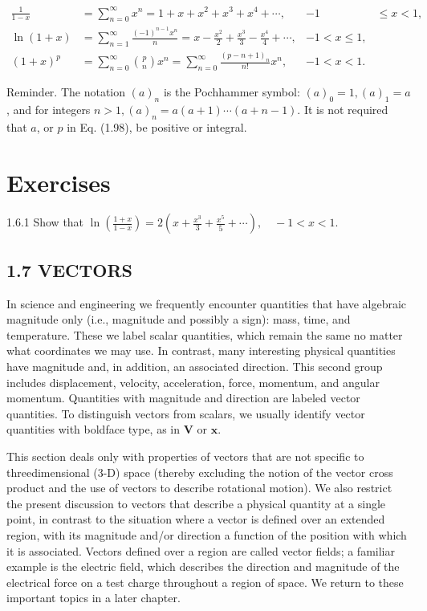 \documentclass[10pt]{article}
\begin{document}
\[
\begin{array}{rlrl}
\frac{1}{1-x} & =\sum_{n=0}^{\infty} x^{n}=1+x+x^{2}+x^{3}+x^{4}+\cdots, & -1 & \leq x<1, \\
\ln (1+x) & =\sum_{n=1}^{\infty} \frac{(-1)^{n-1} x^{n}}{n}=x-\frac{x^{2}}{2}+\frac{x^{3}}{3}-\frac{x^{4}}{4}+\cdots, & -1<x \leq 1, \\
(1+x)^{p} & =\sum_{n=0}^{\infty}\binom{p}{n} x^{n}=\sum_{n=0}^{\infty} \frac{(p-n+1)_{n}}{n!} x^{n}, & -1<x<1 . \tag{1.98}
\end{array}
\]

Reminder. The notation $(a)_{n}$ is the Pochhammer symbol: $(a)_{0}=1,(a)_{1}=a$, and for integers $n>1,(a)_{n}=a(a+1) \cdots(a+n-1)$. It is not required that $a$, or $p$ in Eq. (1.98), be positive or integral.

\section*{Exercises}
1.6.1 Show that $\ln \left(\frac{1+x}{1-x}\right)=2\left(x+\frac{x^{3}}{3}+\frac{x^{5}}{5}+\cdots\right), \quad-1<x<1$.

\subsection*{1.7 VECTORS}
In science and engineering we frequently encounter quantities that have algebraic magnitude only (i.e., magnitude and possibly a sign): mass, time, and temperature. These we label scalar quantities, which remain the same no matter what coordinates we may use. In contrast, many interesting physical quantities have magnitude and, in addition, an associated direction. This second group includes displacement, velocity, acceleration, force, momentum, and angular momentum. Quantities with magnitude and direction are labeled vector quantities. To distinguish vectors from scalars, we usually identify vector quantities with boldface type, as in $\mathbf{V}$ or $\mathbf{x}$.

This section deals only with properties of vectors that are not specific to threedimensional (3-D) space (thereby excluding the notion of the vector cross product and the use of vectors to describe rotational motion). We also restrict the present discussion to vectors that describe a physical quantity at a single point, in contrast to the situation where a vector is defined over an extended region, with its magnitude and/or direction a function of the position with which it is associated. Vectors defined over a region are called vector fields; a familiar example is the electric field, which describes the direction and magnitude of the electrical force on a test charge throughout a region of space. We return to these important topics in a later chapter.
\end{document}
